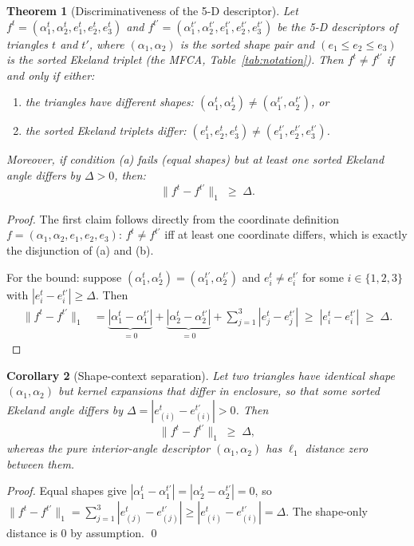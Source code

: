 \documentclass[10pt]{article}
\theoremstyle{plain}
\newtheorem{theorem}{Theorem}[section]
\newtheorem{corollary}[theorem]{Corollary}
\theoremstyle{definition}
\begin{document}
\begin{theorem}[Discriminativeness of the 5-D descriptor]
\label{thm:discriminative}
Let $f^t = (\alpha_1^t, \alpha_2^t, e_1^t, e_2^t, e_3^t)$ and
$f^{t'} = (\alpha_1^{t'}, \alpha_2^{t'}, e_1^{t'}, e_2^{t'}, e_3^{t'})$
be the 5-D descriptors of triangles $t$ and $t'$, where
$(\alpha_1,\alpha_2)$ is the sorted shape pair and $(e_1\le e_2\le e_3)$ is the
sorted Ekeland triplet (the MFCA, Table~\ref{tab:notation}).
Then $f^t \ne f^{t'}$ if and only if either:
\begin{enumerate}[label=(\alph*)]
  \item the triangles have different shapes:
        $(\alpha_1^t, \alpha_2^t) \ne (\alpha_1^{t'}, \alpha_2^{t'})$, or
  \item the sorted Ekeland triplets differ:
        $(e_1^t, e_2^t, e_3^t) \ne (e_1^{t'}, e_2^{t'}, e_3^{t'})$.
\end{enumerate}
Moreover, if condition (a) fails (equal shapes) but at least one sorted Ekeland
angle differs by $\Delta > 0$, then:
\begin{equation}
  \|f^t - f^{t'}\|_1 \;\ge\; \Delta.
\label{eq:descriptor_lb}
\end{equation}
\end{theorem}
\begin{proof}
The first claim follows directly from the coordinate definition
$f = (\alpha_1,\alpha_2,e_1,e_2,e_3)$: $f^t \ne f^{t'}$ iff at least one
coordinate differs, which is exactly the disjunction of (a) and (b).

For the bound: suppose $(\alpha_1^t,\alpha_2^t) = (\alpha_1^{t'},\alpha_2^{t'})$
and $e_i^t \ne e_i^{t'}$ for some $i \in \{1,2,3\}$ with $|e_i^t - e_i^{t'}|
\ge \Delta$.
Then
\begin{align*}
  \|f^t - f^{t'}\|_1
  &= \underbrace{|\alpha_1^t - \alpha_1^{t'}|}_{=0}
   + \underbrace{|\alpha_2^t - \alpha_2^{t'}|}_{=0}
   + \sum_{j=1}^{3}|e_j^t - e_j^{t'}|
  \;\ge\; |e_i^t - e_i^{t'}| \;\ge\; \Delta.
\end{align*}
\end{proof}

\begin{corollary}[Shape-context separation]
\label{cor:separation}
Let two triangles have identical shape $(\alpha_1,\alpha_2)$ but kernel
expansions that differ in enclosure, so that some sorted Ekeland angle differs
by $\Delta=|e_{(i)}^t-e_{(i)}^{t'}|>0$. Then
\begin{equation}
  \|f^t - f^{t'}\|_1 \;\ge\; \Delta,
\end{equation}
whereas the pure interior-angle descriptor $(\alpha_1,\alpha_2)$ has $\ell_1$
distance \emph{zero} between them.
\end{corollary}
\begin{proof}
Equal shapes give $|\alpha_1^t-\alpha_1^{t'}|=|\alpha_2^t-\alpha_2^{t'}|=0$, so
$\|f^t-f^{t'}\|_1=\sum_{j=1}^3|e_{(j)}^t-e_{(j)}^{t'}|\ge|e_{(i)}^t-e_{(i)}^{t'}|=\Delta$.
The shape-only distance is $0$ by assumption. \qed
\end{proof}
\end{document}

